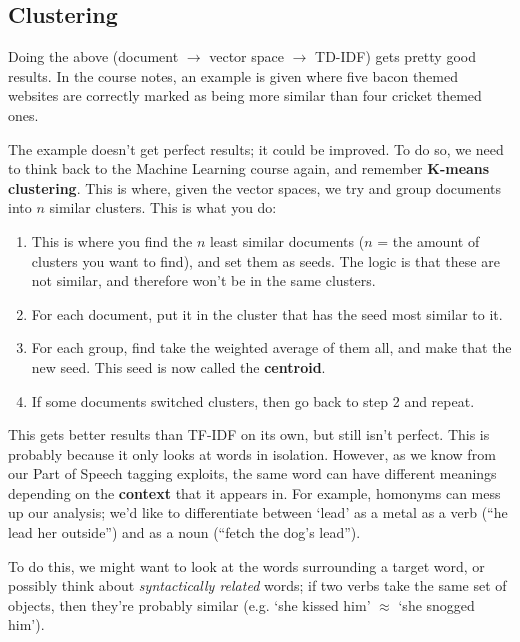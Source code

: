 \subsection{Clustering}

Doing the above (document $\rightarrow$ vector space $\rightarrow$ TD-IDF) gets
pretty good results. In the course notes, an example is given where five bacon
themed websites are correctly marked as being more similar than four cricket
themed ones.

The example doesn't get perfect results; it could be improved. To do so, we need
to think back to the Machine Learning course again, and remember \textbf{K-means
clustering}. This is where, given the vector spaces, we try and group documents
into $n$ similar clusters. This is what you do:

\begin{enumerate}
  \item This is where you find the $n$ least similar documents ($n$ = the
    amount of clusters you want to find), and set them as seeds. The logic is
    that these are not similar, and therefore won't be in the same clusters.
  \item For each document, put it in the cluster that has the seed most similar 
    to it.
  \item For each group, find take the weighted average of them all, and make 
    that the new seed. This seed is now called the \textbf{centroid}.
  \item If some documents switched clusters, then go back to step 2 and repeat.
\end{enumerate}

This gets better results than TF-IDF on its own, but still isn't perfect. This
is probably because it only looks at words in isolation. However, as we know
from our Part of Speech tagging exploits, the same word can have different
meanings depending on the \textbf{context} that it appears in. For example,
homonyms can mess up our analysis; we'd like to differentiate between `lead' as
a metal as a verb (``he lead her outside'') and as a noun (``fetch the dog's
lead'').


To do this, we might want to look at the words surrounding a target word, or
possibly think about \textit{syntactically related} words; if two verbs take the
same set of objects, then they're probably similar (e.g. `she kissed him'
$\approx$ `she snogged him').


